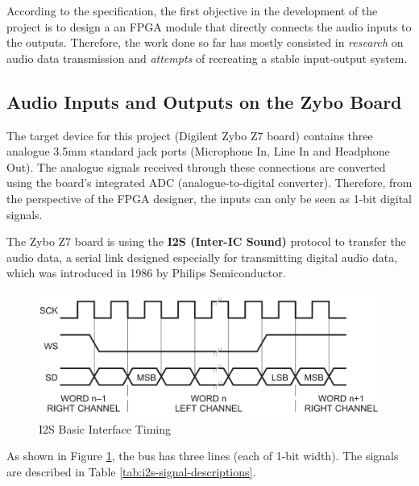 
According to the specification, the first objective in the development of the project is to design a an FPGA module that directly connects the audio inputs to the outputs. Therefore, the work done so far has mostly consisted in \textit{research} on audio data transmission and \textit{attempts} of recreating a stable input-output system.

\subsection{Audio Inputs and Outputs on the Zybo Board}

The target device for this project (Digilent Zybo Z7 board) contains three analogue 3.5mm standard jack ports (Microphone In, Line In and Headphone Out). The analogue signals received through these connections are converted using the board's integrated ADC (analogue-to-digital converter). Therefore, from the perspective of the FPGA designer, the inputs can only be seen as 1-bit digital signals.


The Zybo Z7 board is using the \textbf{I2S (Inter-IC Sound)}\cite{i2s} protocol to transfer the audio data, a serial link designed especially for transmitting digital audio data, which was introduced in 1986 by Philips Semiconductor.

\begin{figure}[h]
    \centering
    \includegraphics[width=0.9\linewidth]{progress-report/i2s-timing.png}
    \caption{I2S Basic Interface Timing}
    \label{fig:i2s-timing}
\end{figure}


As shown in Figure \ref{fig:i2s-timing}, the bus has three lines (each of 1-bit width). The signals are described in Table \ref{tab:i2s-signal-descriptions}.

